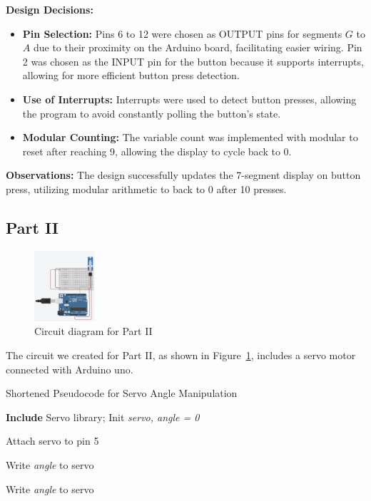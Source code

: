 \documentclass[journal]{IEEEtran}
\begin{document}
\textbf{Design Decisions:}

\begin{itemize}
    \item \textbf{Pin Selection:} Pins 6 to 12 were chosen as OUTPUT pins for segments \( G \) to \( A \) due to their proximity on the Arduino board, facilitating easier wiring. Pin 2 was chosen as the INPUT pin for the button because it supports interrupts, allowing for more efficient button press detection.
    
    \item \textbf{Use of Interrupts:} Interrupts were used to detect button presses, allowing the program to avoid constantly polling the button's state. 
    
    \item \textbf{Modular Counting:} The variable \( \text{count} \) was implemented with modular to reset after reaching 9, allowing the display to cycle back to 0.
\end{itemize}


\textbf{Observations:} The design successfully updates the 7-segment display on button press, utilizing modular arithmetic to back to 0 after 10 presses. 


\subsection{Part II}

\begin{figure}[H]
\centering
\includegraphics[width=0.2\textwidth]{images/Part2_circuits.jpg}
\caption{Circuit diagram for Part II}
\label{fig:circuit_part2}
\end{figure}

The circuit we created for Part II, as shown in Figure~\ref{fig:circuit_part2}, includes a servo motor connected with Arduino uno.

\begin{algorithm}
\caption{Shortened Pseudocode for Servo Angle Manipulation}\label{alg:servo-short}
\begin{algorithmic}[1]
\State \textbf{Include} Servo library; Init \textit{servo, angle = 0}

    \State Attach servo to pin 5
\EndFunction

        \State Write \textit{angle} to servo
    \EndFor
    
        \State Write \textit{angle} to servo
    \EndFor
\EndFunction
\end{algorithmic}
\end{algorithm}
\end{document}
